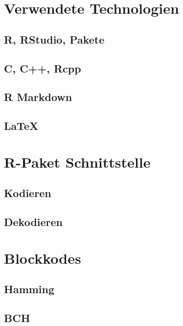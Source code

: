 
\section{Verwendete Technologien}
\label{section:technologies}

\subsection{R, RStudio, Pakete}
\subsection{C, C++, Rcpp}
\subsection{R Markdown}
\subsection{\LaTeX}


\section{R-Paket Schnittstelle}
\label{section:interface}


\subsection{Kodieren}
\label{sec:interface_encode}


\subsection{Dekodieren}
\label{sec:interface_decode}


\section{Blockkodes}
\label{section:impl_block}

\subsection{Hamming}
\subsection{BCH}



